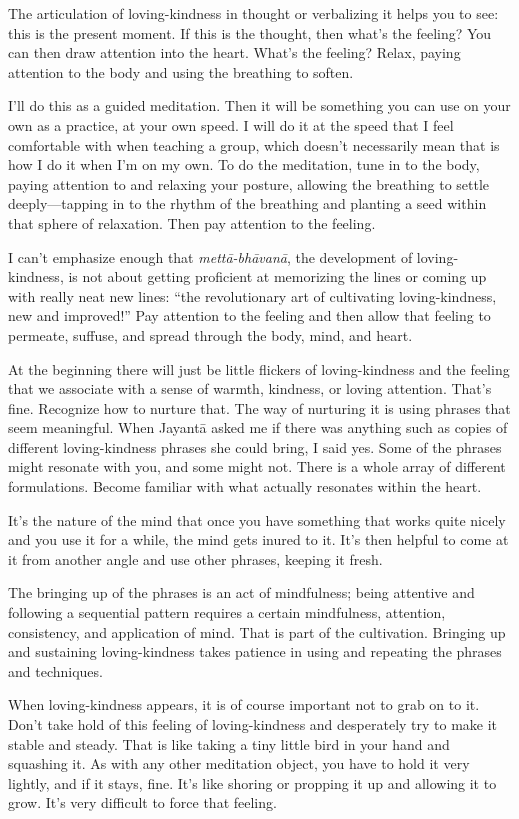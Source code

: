 The articulation of loving-kindness in thought or verbalizing it helps
you to see: this is the present moment. If this is the thought, then
what’s the feeling? You can then draw attention into the heart. What’s
the feeling? Relax, paying attention to the body and using the breathing
to soften.

I’ll do this as a guided meditation. Then it will be something you can
use on your own as a practice, at your own speed. I will do it at the
speed that I feel comfortable with when teaching a group, which doesn’t
necessarily mean that is how I do it when I’m on my own. To do the
meditation, tune in to the body, paying attention to and relaxing your
posture, allowing the breathing to settle deeply—tapping in to the
rhythm of the breathing and planting a seed within that sphere of
relaxation. Then pay attention to the feeling.

I can’t emphasize enough that \emph{mettā-bhāvanā}, the development of
loving-kindness, is not about getting proficient at memorizing the lines
or coming up with really neat new lines: “the revolutionary art of
cultivating loving-kindness, new and improved!” Pay attention to the
feeling and then allow that feeling to permeate, suffuse, and spread
through the body, mind, and heart.

At the beginning there will just be little flickers of loving-kindness
and the feeling that we associate with a sense of warmth, kindness, or
loving attention. That’s fine. Recognize how to nurture that. The way of
nurturing it is using phrases that seem meaningful. When Jayantā asked
me if there was anything such as copies of different loving-kindness
phrases she could bring, I said yes. Some of the phrases might resonate
with you, and some might not. There is a whole array of different
formulations. Become familiar with what actually resonates within the
heart.

It’s the nature of the mind that once you have something that works
quite nicely and you use it for a while, the mind gets inured to it.
It’s then helpful to come at it from another angle and use other
phrases, keeping it fresh.

The bringing up of the phrases is an act of mindfulness; being attentive
and following a sequential pattern requires a certain mindfulness,
attention, consistency, and application of mind. That is part of the
cultivation. Bringing up and sustaining loving-kindness takes patience
in using and repeating the phrases and techniques.

When loving-kindness appears, it is of course important not to grab on
to it. Don’t take hold of this feeling of loving-kindness and
desperately try to make it stable and steady. That is like taking a tiny
little bird in your hand and squashing it. As with any other meditation
object, you have to hold it very lightly, and if it stays, fine. It’s
like shoring or propping it up and allowing it to grow. It’s very
difficult to force that feeling.


